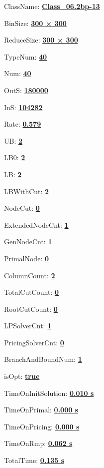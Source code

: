 \documentclass[11pt]{article}
\begin{document}
\pagestyle{empty}


ClassName: \underline{\textbf{Class_06.2bp-13}}
\par
BinSize: \underline{\textbf{300 × 300}}
\par
ReduceSize: \underline{\textbf{300 × 300}}
\par
TypeNum: \underline{\textbf{40}}
\par
Num: \underline{\textbf{40}}
\par
OutS: \underline{\textbf{180000}}
\par
InS: \underline{\textbf{104282}}
\par
Rate: \underline{\textbf{0.579}}
\par
UB: \underline{\textbf{2}}
\par
LB0: \underline{\textbf{2}}
\par
LB: \underline{\textbf{2}}
\par
LBWithCut: \underline{\textbf{2}}
\par
NodeCut: \underline{\textbf{0}}
\par
ExtendedNodeCnt: \underline{\textbf{1}}
\par
GenNodeCnt: \underline{\textbf{1}}
\par
PrimalNode: \underline{\textbf{0}}
\par
ColumnCount: \underline{\textbf{2}}
\par
TotalCutCount: \underline{\textbf{0}}
\par
RootCutCount: \underline{\textbf{0}}
\par
LPSolverCnt: \underline{\textbf{1}}
\par
PricingSolverCnt: \underline{\textbf{0}}
\par
BranchAndBoundNum: \underline{\textbf{1}}
\par
isOpt: \underline{\textbf{true}}
\par
TimeOnInitSolution: \underline{\textbf{0.010 s}}
\par
TimeOnPrimal: \underline{\textbf{0.000 s}}
\par
TimeOnPricing: \underline{\textbf{0.000 s}}
\par
TimeOnRmp: \underline{\textbf{0.062 s}}
\par
TotalTime: \underline{\textbf{0.135 s}}
\par
\newpage
\end{document}
